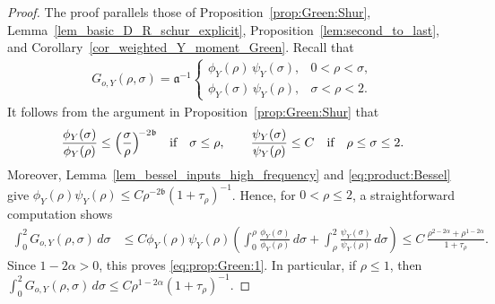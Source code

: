 \documentclass[12pt]{amsart}
\begin{document}
\begin{proof}
The proof parallels those of Proposition~\ref{prop:Green:Shur}, Lemma~\ref{lem_basic_D_R_schur_explicit}, Proposition~\ref{lem:second_to_last}, and Corollary~\ref{cor_weighted_Y_moment_Green}. Recall that
\begin{align*}
G_{o,Y}(\rho,\sigma) = \mathfrak a^{-1}
\begin{cases}
\phi_{Y}(\rho) \, \psi_{Y}(\sigma), &0<\rho<\sigma,\\[4pt]
\phi_{Y}(\sigma) \, \psi_{Y}(\rho), &\sigma < \rho < 2.
\end{cases}
\end{align*}
It follows from the argument in Proposition~\ref{prop:Green:Shur} that
\begin{equation*}
    \frac{\phi_Y(\sigma)}{\phi_Y(\rho)}\le \Bigl(\frac{\sigma}{\rho}\Bigr)^{\!-2\mathfrak b}\quad \text{if}\quad \sigma\le \rho,\qquad \frac{\psi_Y(\sigma)}{\psi_Y(\rho)}\le C \quad \text{if}\quad \rho \le \sigma\le 2.
\end{equation*}
Moreover, Lemma~\ref{lem_bessel_inputs_high_frequency} and \eqref{eq:product:Bessel} give $\phi_Y(\rho) \psi_Y(\rho) \le C\rho^{-2\mathfrak b}(1+\tau_\rho)^{-1}$.
Hence, for $0<\rho\le 2$, a straightforward computation shows
\begin{align*}
    \int_0^2 G_{o,Y}(\rho,\sigma) \, d\sigma
    &\le C \phi_Y(\rho) \psi_Y(\rho)  \left(\int_0^\rho \frac{\phi_Y(\sigma)}{\phi_Y(\rho)} \, d\sigma  +  \int_\rho^2 \frac{\psi_Y(\sigma)}{\psi_Y(\rho)} \, d\sigma \right)\le C\,\frac{\rho^{2-2\alpha} + \rho^{1-2\alpha}}{1+\tau_\rho}.
\end{align*}
Since $1-2\alpha >0$, this proves \eqref{eq:prop:Green:1}. In particular, if $\rho \le 1$, then $\int_0^2 G_{o,Y}(\rho,\sigma) \, d\sigma \le C\rho^{1-2\alpha}(1+\tau_\rho)^{-1}$.


\end{proof}
\end{document}
